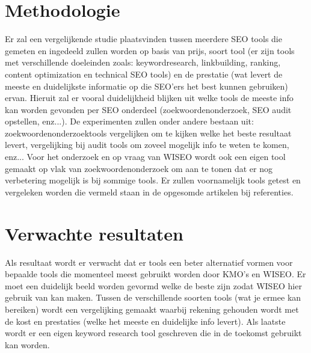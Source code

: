 
\section{Methodologie}
\label{sec:methodologie}

Er zal een vergelijkende studie plaatsvinden tussen meerdere SEO tools die gemeten en ingedeeld zullen worden op basis van prijs, soort tool (er zijn tools met verschillende doeleinden zoals: keywordresearch, linkbuilding, ranking, content optimization en technical SEO tools) en de prestatie (wat levert de meeste en duidelijkste informatie op die SEO'ers het best kunnen gebruiken) ervan. Hieruit zal er vooral duidelijkheid blijken uit welke tools de meeste info kan worden gevonden per SEO onderdeel (zoekwoordenonderzoek, SEO audit opstellen, enz...). De experimenten zullen onder andere bestaan uit: zoekwoordenonderzoektools vergelijken om te kijken welke het beste resultaat levert, vergelijking bij audit tools om zoveel mogelijk info te weten te komen, enz... Voor het onderzoek en op vraag van WISEO wordt ook een eigen tool gemaakt op vlak van zoekwoordenonderzoek om aan te tonen dat er nog verbetering mogelijk is bij sommige tools. Er zullen voornamelijk tools getest en vergeleken worden die vermeld staan in de opgesomde artikelen bij referenties.

\section{Verwachte resultaten}
\label{sec:verwachte_resultaten}

Als resultaat wordt er verwacht dat er tools een beter alternatief vormen voor bepaalde tools die momenteel meest gebruikt worden door KMO's en WISEO. Er moet een duidelijk beeld worden gevormd welke de beste zijn zodat WISEO hier gebruik van kan maken. Tussen de verschillende soorten tools (wat je ermee kan bereiken) wordt een vergelijking gemaakt waarbij rekening gehouden wordt met de kost en prestaties (welke het meeste en duidelijke info levert). Als laatste wordt er een eigen keyword research tool geschreven die in de toekomst gebruikt kan worden.

